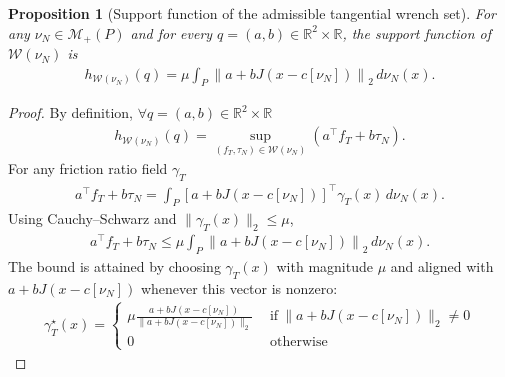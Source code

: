 \documentclass[11pt,a4paper]{article}
\theoremstyle{plain}
\newtheorem{proposition}[theorem]{Proposition}
\newcommand{\R}{\mathbb{R}}
\begin{document}
\begin{proposition}[Support function of the admissible tangential wrench set]
    \label{prop:support}
    For any $\nu_N\in\mathcal M_+(P)$ and for every $q=(a,b)\in\mathbb R^2\times\mathbb R$, the support function of $\mathcal W(\nu_N)$ is
    \begin{align}
    h_{\mathcal W(\nu_N)}(q) = \mu \int_P \left\|a+bJ(x-c[\nu_N])\right\|_2\,d\nu_N(x).
    \end{align}
\end{proposition}
\begin{proof}
    By definition, $\forall q=(a,b)\in\R^2\times \R$
    \begin{align}
    h_{\mathcal W(\nu_N)}(q) =\sup_{(f_T,\tau_N)\in\mathcal W(\nu_N)}\left(a^\top f_T+b\tau_N\right).
    \end{align}
    For any friction ratio field $\gamma_T$
    \begin{align}
    a^\top f_T+b\tau_N=\int_P\left[a+bJ(x-c[\nu_N])\right]^\top\gamma_T(x)\,d\nu_N(x).
    \end{align}
    Using Cauchy--Schwarz and
    $\|\gamma_T(x)\|_2\le\mu$,
    \begin{align}
    a^\top f_T+b\tau_N\le\mu\int_P\left\|a+bJ(x-c[\nu_N])\right\|_2\,d\nu_N(x).
    \end{align}
    The bound is attained by choosing $\gamma_T(x)$ with magnitude $\mu$ and aligned with
    $a+bJ(x-c[\nu_N])$ whenever this vector is nonzero:
    \begin{align}
        \gamma_T^{\star}(x)= \begin{cases}
                \mu\frac{a + bJ(x-c[\nu_N])}{\|a + bJ(x-c[\nu_N])\|_2}~~&\text{if}~\|a + bJ(x-c[\nu_N])\|_2\neq 0\\
                0~~&\text{otherwise}
        \end{cases} 
    \end{align}
\end{proof}
\end{document}
